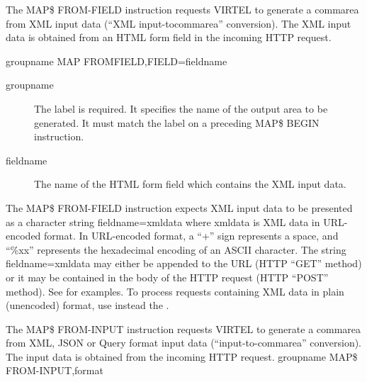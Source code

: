 \documentclass[letterpaper,10pt,english]{sphinxmanual}
\begin{document}
The MAP\$ FROM-FIELD instruction requests VIRTEL to generate a commarea from XML input data (“XML input-tocommarea” conversion). The XML input data is obtained from an HTML form field in the incoming HTTP request.

\begin{sphinxVerbatim}[commandchars=\\\{\}]
groupname MAP\PYGZdl{} FROM\PYGZhy{}FIELD,FIELD=\PYGZsq{}fieldname\PYGZsq{}
\end{sphinxVerbatim}
\begin{description}
\item[{groupname}] \leavevmode
The label is required. It specifies the name of the output area to be generated. It must match the label on a preceding MAP\$ BEGIN instruction.

\item[{fieldname}] \leavevmode
The name of the HTML form field which contains the XML input data.

\end{description}

The MAP\$ FROM-FIELD instruction expects XML input data to be presented as a character string fieldname=xmldata
where xmldata is XML data in URL-encoded format. In URL-encoded format, a “+” sign represents a space, and “\%xx”
represents the hexadecimal encoding of an ASCII character. The string fieldname=xmldata may either be appended to
the URL (HTTP “GET” method) or it may be contained in the body of the HTTP request (HTTP “POST” method). See
{\hyperref[\detokenize{User_Guide:v457ug-sending-xml}]{}} for examples. To process requests containing XML data in plain
(unencoded) format, use instead the {\hyperref[\detokenize{User_Guide:v457ug-map-from-input}]{}}.
\label{\detokenize{User_Guide:v457ug-map-from-input}}

The MAP\$ FROM-INPUT instruction requests VIRTEL to generate a commarea from XML, JSON or Query format input
data (“input-to-commarea” conversion). The input data is obtained from the incoming HTTP request.
groupname MAP\$ FROM-INPUT,format
\end{document}
